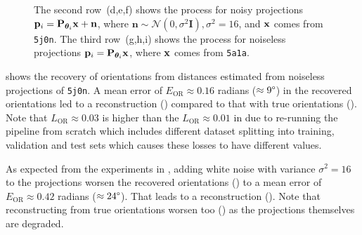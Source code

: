 \begin{figure}[t]
{        The second row~(d,e,f) shows the process for noisy projections $\mathbf{p}_i = \mathbf{P}_{{\boldsymbol{\theta}}_i} \mathbf{x} + \mathbf{n}$, where $\mathbf{n} \sim \mathcal{N}(0, \sigma^2\mathbf{I}), \sigma^2=16$, and $\mathbf{x}$ comes from \texttt{5j0n}.
        The third row~(g,h,i) shows the process for noiseless projections $\mathbf{p}_i = \mathbf{P}_{{\boldsymbol{\theta}}_i} \mathbf{x}$, where $\mathbf{x}$ comes from \texttt{5a1a}.
    }
\end{figure}

 shows the recovery of orientations from distances estimated from noiseless projections of \texttt{5j0n}.
A mean error of $E_\text{OR} \approx 0.16$ radians ($\approx 9\degree$) in the recovered orientations led to a  reconstruction () compared to that with true orientations ().
 
Note that $L_\text{OR} \approx 0.03$ is higher than the $L_\text{OR} \approx 0.01$ in  due to re-running the pipeline from scratch which includes different dataset splitting into training, validation and test sets which causes these losses to have different values.

As expected from the experiments in , adding white noise with variance $\sigma^2=16$ to the projections worsen the recovered orientations () to a mean error of $E_\text{OR} \approx 0.42$ radians ($\approx 24\degree$).
That leads to a  reconstruction ().
Note that reconstructing from true orientations worsen too  () as the projections themselves are degraded.

